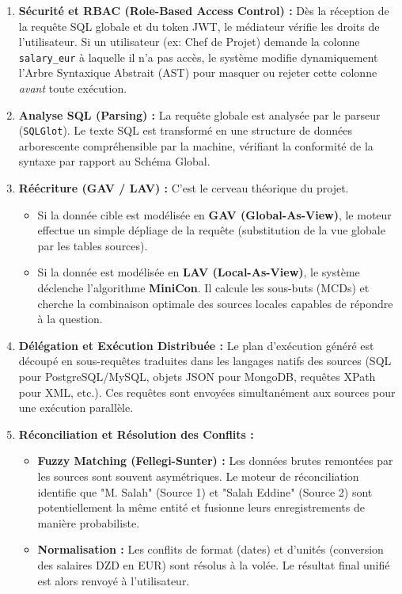 \documentclass[11pt,a4paper]{article}
\begin{document}
\begin{enumerate}
    \item \textbf{Sécurité et RBAC (Role-Based Access Control) :} Dès la réception de la requête SQL globale et du token JWT, le médiateur vérifie les droits de l'utilisateur. Si un utilisateur (ex: Chef de Projet) demande la colonne \texttt{salary\_eur} à laquelle il n'a pas accès, le système modifie dynamiquement l'Arbre Syntaxique Abstrait (AST) pour masquer ou rejeter cette colonne \textit{avant} toute exécution.
    
    \item \textbf{Analyse SQL (Parsing) :} La requête globale est analysée par le parseur (\texttt{SQLGlot}). Le texte SQL est transformé en une structure de données arborescente compréhensible par la machine, vérifiant la conformité de la syntaxe par rapport au Schéma Global.
    
    \item \textbf{Réécriture (GAV / LAV) :} C'est le cerveau théorique du projet. 
    \begin{itemize}
        \item Si la donnée cible est modélisée en \textbf{GAV (Global-As-View)}, le moteur effectue un simple dépliage de la requête (substitution de la vue globale par les tables sources).
        \item Si la donnée est modélisée en \textbf{LAV (Local-As-View)}, le système déclenche l'algorithme \textbf{MiniCon}. Il calcule les sous-buts (MCDs) et cherche la combinaison optimale des sources locales capables de répondre à la question.
    \end{itemize}
    
    \item \textbf{Délégation et Exécution Distribuée :} Le plan d'exécution généré est découpé en sous-requêtes traduites dans les langages natifs des sources (SQL pour PostgreSQL/MySQL, objets JSON pour MongoDB, requêtes XPath pour XML, etc.). Ces requêtes sont envoyées simultanément aux sources pour une exécution parallèle.
    
    \item \textbf{Réconciliation et Résolution des Conflits :}
    \begin{itemize}
        \item \textbf{Fuzzy Matching (Fellegi-Sunter) :} Les données brutes remontées par les sources sont souvent asymétriques. Le moteur de réconciliation identifie que "M. Salah" (Source 1) et "Salah Eddine" (Source 2) sont potentiellement la même entité et fusionne leurs enregistrements de manière probabiliste.
        \item \textbf{Normalisation :} Les conflits de format (dates) et d'unités (conversion des salaires DZD en EUR) sont résolus à la volée. Le résultat final unifié est alors renvoyé à l'utilisateur.
    \end{itemize}
\end{enumerate}
\end{document}

